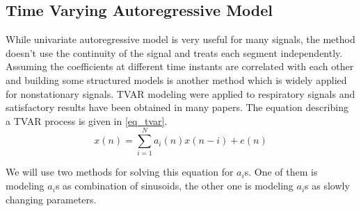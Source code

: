 \subsection{Time Varying Autoregressive Model}
While univariate autoregressive model is very useful for many signals, the method doesn't use the continuity of the signal and treats each segment independently. Assuming the coefficients at different time instants are correlated with each other and building some structured models is another method which is widely applied for nonstationary signals. TVAR modeling were applied to respiratory signals and satisfactory results have been obtained in many papers. The equation describing a TVAR process is given in \eqref{eq_tvar}. 
\begin{equation}\label{eq_tvar}
x(n) = \sum_{i=1}^{N}{a_i(n)x(n-i)} + e(n) 
\end{equation} \par
We will use two methods for solving this equation for $a_i$s. One of them is modeling $a_i$s as combination of sinusoids, the other one is modeling $a_i$s as slowly changing parameters.

